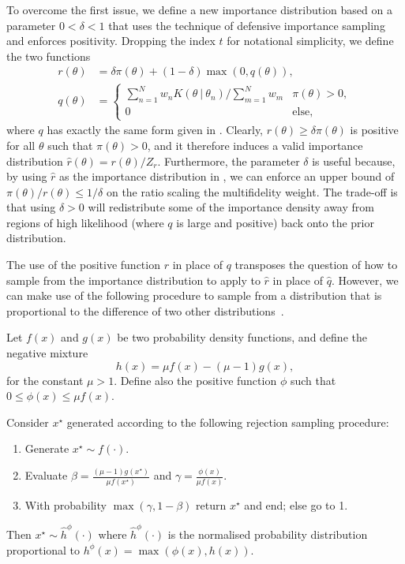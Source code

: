\documentclass[review,demo]{siamonline190516}
\begin{document}
To overcome the first issue, we define a new importance distribution based on a parameter $0<\delta<1$ that uses the technique of defensive importance sampling~\cite{Owen2013} and enforces positivity.
Dropping the index $t$ for notational simplicity, we define the two functions
\begin{subequations}
\label{eq:DefensiveImportance}
\begin{align}
 r(\theta) &= \delta \pi(\theta) + (1-\delta) \max\left( 0, q(\theta) \right),
 \\
 q(\theta) &= \begin{cases}
                      \sum_{n=1}^{N} w_n K(\theta ~|~ \theta_n) \big/ \sum_{m=1}^{N} w_m & \pi(\theta)>0, 
                      \\
                      0 & \text{else,}
                    \end{cases}
\end{align}
\end{subequations}
where $q$ has exactly the same form given in .
Clearly, $r(\theta) \geq \delta \pi(\theta)$ is positive for all $\theta$ such that $\pi(\theta)>0$, and it therefore induces a valid importance distribution $\hat r(\theta) = r(\theta)/Z_r$.
Furthermore, the parameter $\delta$ is useful because, by using $\hat r$ as the importance distribution in , we can enforce an upper bound of $\pi(\theta)/r(\theta) \leq 1/\delta$ on the ratio scaling the multifidelity weight.
The trade-off is that using $\delta>0$ will redistribute some of the importance density away from regions of high likelihood (where $q$ is large and positive) back onto the prior distribution.

The use of the positive function $r$ in place of $q$ transposes the question of how to sample from the importance distribution to apply to $\hat r$ in place of $\hat q$.
However, we can make use of the following procedure to sample from a distribution that is proportional to the difference of two other distributions~\cite{Rabusseau2014}.

\begin{lemma}
\label{negmix}
Let $f(x)$ and $g(x)$ be two probability density functions, and define the negative mixture
\[
 h(x) = \mu f(x) - (\mu - 1) g(x),
\]
for the constant $\mu > 1$. 
Define also the positive function $\phi$ such that $0 \leq \phi(x) \leq \mu f(x)$. 

Consider $x^\star$ generated according to the following rejection sampling procedure:
\begin{enumerate}
 \item Generate $x^\star \sim f(\cdot)$.
 \item Evaluate $\beta = \frac{(\mu-1)g(x^\star)}{\mu f(x^\star)}$ and $\gamma = \frac{\phi(x)}{\mu f(x)}$.
 \item With probability $\max(\gamma, 1-\beta)$ return $x^\star$ and end; else go to 1.
\end{enumerate}
Then $x^\star \sim \hat h^\phi(\cdot)$ where $\hat h^\phi(\cdot)$ is the normalised probability distribution proportional to $h^\phi(x) = \max(\phi(x), h(x))$.
\end{lemma}
\end{document}
